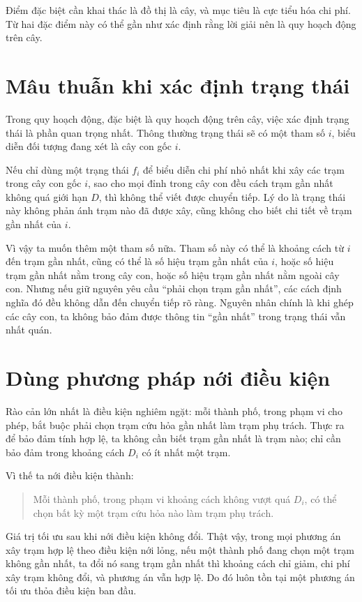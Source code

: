 \documentclass[11pt]{article}
\begin{document}
Điểm đặc biệt cần khai thác là đồ thị là cây, và mục tiêu là cực tiểu hóa chi
phí. Từ hai đặc điểm này có thể gần như xác định rằng lời giải nên là quy
hoạch động trên cây.

\section{Mâu thuẫn khi xác định trạng thái}

Trong quy hoạch động, đặc biệt là quy hoạch động trên cây, việc xác định trạng
thái là phần quan trọng nhất. Thông thường trạng thái sẽ có một tham số \(i\),
biểu diễn đối tượng đang xét là cây con gốc \(i\).

Nếu chỉ dùng một trạng thái \(f_i\) để biểu diễn chi phí nhỏ nhất khi xây các
trạm trong cây con gốc \(i\), sao cho mọi đỉnh trong cây con đều cách trạm gần
nhất không quá giới hạn \(D\), thì không thể viết được chuyển tiếp. Lý do là
trạng thái này không phản ánh trạm nào đã được xây, cũng không cho biết chi
tiết về trạm gần nhất của \(i\).

Vì vậy ta muốn thêm một tham số nữa. Tham số này có thể là khoảng cách từ
\(i\) đến trạm gần nhất, cũng có thể là số hiệu trạm gần nhất của \(i\), hoặc
số hiệu trạm gần nhất nằm trong cây con, hoặc số hiệu trạm gần nhất nằm ngoài
cây con. Nhưng nếu giữ nguyên yêu cầu ``phải chọn trạm gần nhất'', các cách
định nghĩa đó đều không dẫn đến chuyển tiếp rõ ràng. Nguyên nhân chính là khi
ghép các cây con, ta không bảo đảm được thông tin ``gần nhất'' trong trạng
thái vẫn nhất quán.

\section{Dùng phương pháp nới điều kiện}

Rào cản lớn nhất là điều kiện nghiêm ngặt: mỗi thành phố, trong phạm vi cho
phép, bắt buộc phải chọn trạm cứu hỏa gần nhất làm trạm phụ trách. Thực ra để
bảo đảm tính hợp lệ, ta không cần biết trạm gần nhất là trạm nào; chỉ cần bảo
đảm trong khoảng cách \(D_i\) có ít nhất một trạm.

Vì thế ta nới điều kiện thành:

\begin{quote}
Mỗi thành phố, trong phạm vi khoảng cách không vượt quá \(D_i\), có thể chọn
bất kỳ một trạm cứu hỏa nào làm trạm phụ trách.
\end{quote}

Giá trị tối ưu sau khi nới điều kiện không đổi. Thật vậy, trong mọi phương án
xây trạm hợp lệ theo điều kiện nới lỏng, nếu một thành phố đang chọn một trạm
không gần nhất, ta đổi nó sang trạm gần nhất thì khoảng cách chỉ giảm, chi phí
xây trạm không đổi, và phương án vẫn hợp lệ. Do đó luôn tồn tại một phương án
tối ưu thỏa điều kiện ban đầu.
\end{document}
